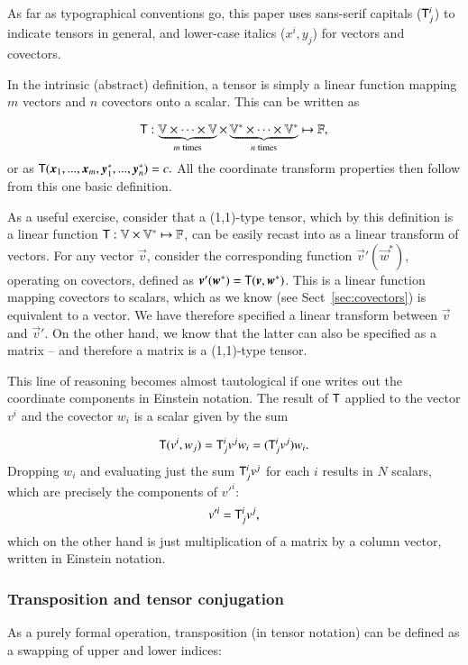 \documentclass{aa}
\begin{document}
As far as typographical conventions go, this paper uses sans-serif capitals ($\mathsf{T}_j^i$) to indicate tensors in general, and lower-case italics ($x^i, y_j$) for vectors and covectors.

In the intrinsic (abstract) definition, a tensor is simply a linear function mapping $m$ vectors and $n$ covectors onto a scalar. This can be written as

\[
  \mathsf{T}: \underbrace{\mathbb{V}\times\cdots\times\mathbb{V}}_{m\;\mathrm{times}}\times
  \underbrace{\mathbb{V}^*\times\cdots\times\mathbb{V}^*}_{n\;\mathrm{times}} \mapsto \mathbb{F},
\]
or as $\tens{T}(\vec x_1,...,\vec x_m,\vec y^*_1,...,\vec y^*_n)=c.$ All the coordinate transform properties then follow from this one basic definition.

As a useful exercise, consider that a (1,1)-type tensor, which by this definition is a linear function $\mathsf{T}:\mathbb{V}\times\mathbb{V}^* \mapsto \mathbb{F}$, can be easily recast into as a linear transform of vectors. For any vector $\vec v$, consider the corresponding function $\vec v'(\vec w^*)$, operating on covectors, defined as $\vec v'(\vec w^*)= \tens{T}(\vec v,\vec w^*)$. This is a linear function mapping covectors to scalars, which as we know (see Sect~\ref{sec:covectors}) is equivalent to a vector. We have therefore specified a linear transform between $\vec v$ and $\vec v'$. On the other hand, we know that the latter can also be specified as a matrix -- and therefore a matrix is a (1,1)-type tensor. 

This line of reasoning becomes almost tautological if one writes out the coordinate components in Einstein notation. The result of $\mathsf{T}$ applied to the vector $v^i$ and the covector $w_i$ is a scalar given by the sum

\[
  \mathsf{T}(v^i,w_j) = \mathsf{T}^i_j v^j w_i = ( \mathsf{T}^i_j v^j ) w_i.
\]
Dropping $w_i$ and evaluating just the sum $\mathsf{T}^i_j v^j$ for each $i$ results in $N$ scalars, which are precisely the components of $v'^i$:
\[
  v'^i = \mathsf{T}^i_j v^j,
\]
which on the other hand is just multiplication of a matrix by a column vector, written in Einstein notation.

\subsubsection{Transposition and tensor conjugation}
\label{sec:tensor-transposition}

As a purely formal operation, transposition (in tensor notation) can be defined as a swapping of upper and lower indices:
\end{document}
